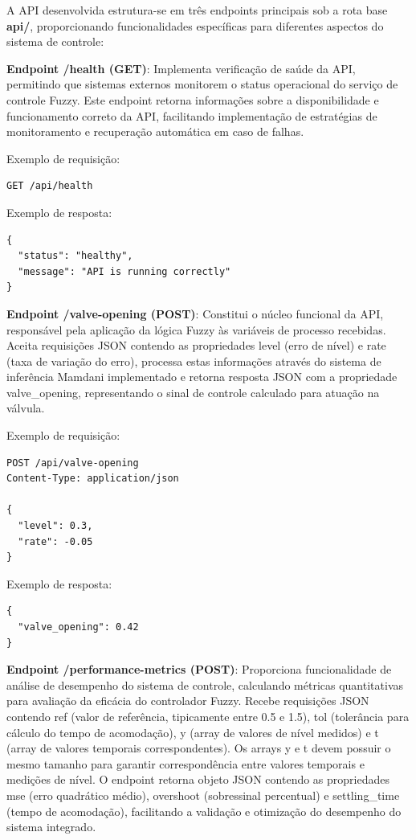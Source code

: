 A API desenvolvida estrutura-se em três endpoints principais sob a rota base \textbf{api/}, proporcionando funcionalidades específicas para diferentes aspectos do sistema de controle:

\textbf{Endpoint /health (GET)}: Implementa verificação de saúde da API, permitindo que sistemas externos monitorem o status operacional do serviço de controle Fuzzy. Este endpoint retorna informações sobre a disponibilidade e funcionamento correto da API, facilitando implementação de estratégias de monitoramento e recuperação automática em caso de falhas.

Exemplo de requisição:

\begin{verbatim}
GET /api/health
\end{verbatim}

Exemplo de resposta:

\begin{center}
\begin{verbatim}
{
  "status": "healthy",
  "message": "API is running correctly"
}
\end{verbatim}
\end{center}

\textbf{Endpoint /valve-opening (POST)}: Constitui o núcleo funcional da API, responsável pela aplicação da lógica Fuzzy às variáveis de processo recebidas. Aceita requisições JSON contendo as propriedades level (erro de nível) e rate (taxa de variação do erro), processa estas informações através do sistema de inferência Mamdani implementado e retorna resposta JSON com a propriedade valve\_opening, representando o sinal de controle calculado para atuação na válvula.

Exemplo de requisição:

\begin{verbatim}
POST /api/valve-opening
Content-Type: application/json

{
  "level": 0.3,
  "rate": -0.05
}
\end{verbatim}

Exemplo de resposta:

\begin{center}
\begin{verbatim}
{
  "valve_opening": 0.42
}
\end{verbatim}
\end{center}

\textbf{Endpoint /performance-metrics (POST)}: Proporciona funcionalidade de análise de desempenho do sistema de controle, calculando métricas quantitativas para avaliação da eficácia do controlador Fuzzy. Recebe requisições JSON contendo ref (valor de referência, tipicamente entre 0.5 e 1.5), tol (tolerância para cálculo do tempo de acomodação), y (array de valores de nível medidos) e t (array de valores temporais correspondentes). Os arrays y e t devem possuir o mesmo tamanho para garantir correspondência entre valores temporais e medições de nível. O endpoint retorna objeto JSON contendo as propriedades mse (erro quadrático médio), overshoot (sobressinal percentual) e settling\_time (tempo de acomodação), facilitando a validação e otimização do desempenho do sistema integrado.

